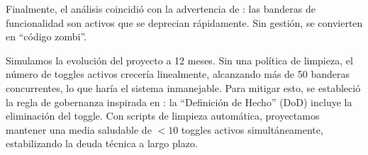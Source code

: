 Finalmente, el análisis coincidió con la advertencia de \cite{ortiz2021toggledebt}: las banderas de funcionalidad son activos que se deprecian rápidamente. Sin gestión, se convierten en ``código zombi''.

Simulamos la evolución del proyecto a 12 meses. Sin una política de limpieza, el número de toggles activos crecería linealmente, alcanzando más de 50 banderas concurrentes, lo que haría el sistema inmanejable. Para mitigar esto, se estableció la regla de gobernanza inspirada en \cite{sridharan2020piranha}: la ``Definición de Hecho'' (DoD) incluye la eliminación del toggle. Con scripts de limpieza automática, proyectamos mantener una media saludable de $<10$ toggles activos simultáneamente, estabilizando la deuda técnica a largo plazo.
